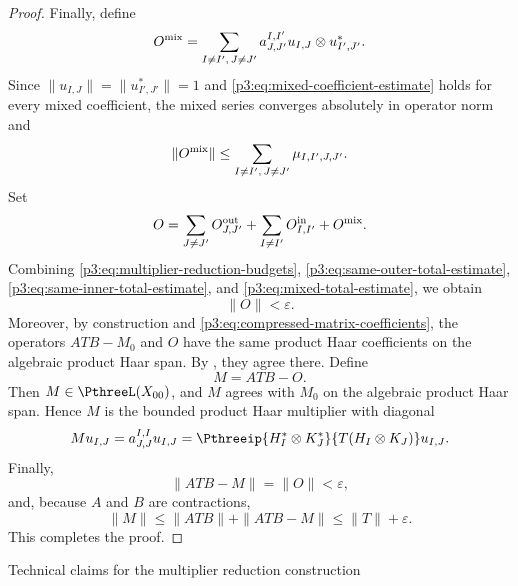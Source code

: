 \documentclass[11pt,reqno]{amsart}
\makeatletter
\theoremstyle{plain}
\theoremstyle{definition}
\newcounter{problempaper}
\newenvironment{problempaperbody}{%
  \setcounter{subsection}{0}%
  \setcounter{subsubsection}{0}%
  \setcounter{paragraph}{0}%
  \renewcommand{\thesubsection}{\arabic{subsection}}%
  \renewcommand{\thesubsubsection}{\thesubsection.\arabic{subsubsection}}%
  \renewcommand{\theparagraph}{\thesubsubsection.\arabic{paragraph}}%
  \let\problem@outersection\section
  \let\problem@outersubsection\subsection
  \let\problem@outersubsubsection\subsubsection
  \let\problem@outerparagraph\paragraph
  \let\section\problem@papersection
  \let\subsection\problem@papersubsection
  \let\subsubsection\problem@papersubsubsection
}{%
  \let\section\problem@outersection
  \let\subsection\problem@outersubsection
  \let\subsubsection\problem@outersubsubsection
  \let\paragraph\problem@outerparagraph
}
\newcommand{\problem@target}[2]{%
  \hypertarget{problem-\theproblempaper-#1-#2}{}%
}
\newcommand{\problem@paperheading}[3]{%
  \par\bigskip
  \problem@target{#1}{#2}%
  \noindent{\large\bfseries #2.\quad #3\par}%
  \nobreak\smallskip
}
\newcommand{\problem@papersubheading}[3]{%
  \par\medskip
  \problem@target{#1}{#2}%
  \noindent{\normalsize\bfseries #2.\quad #3\par}%
  \nobreak\smallskip
}
\newcommand{\problem@papersubsubheading}[3]{%
  \par\smallskip
  \problem@target{#1}{#2}%
  \noindent{\normalsize\itshape #2.\quad #3.\ }%
}
\def\problem@papersection{%
  \@ifstar{\problem@papersectionstar}{\problem@papersectionnostar}%
}
\def\problem@papersectionstar#1{%
  \par\bigskip\noindent{\large\bfseries #1\par}\nobreak\smallskip
}
\def\problem@papersectionnostar#1{%
  \refstepcounter{subsection}%
  \setcounter{subsubsection}{0}%
  \setcounter{paragraph}{0}%
  \problem@paperheading{section}{\thesubsection}{#1}%
  \problem@writecontentsline{section}{\thesubsection}{#1}%
}
\def\problem@papersubsection{%
  \@ifstar{\problem@papersubsectionstar}{\problem@papersubsectionnostar}%
}
\def\problem@papersubsectionstar#1{%
  \par\medskip\noindent{\normalsize\bfseries #1\par}\nobreak\smallskip
}
\def\problem@papersubsectionnostar#1{%
  \refstepcounter{subsubsection}%
  \setcounter{paragraph}{0}%
  \problem@papersubheading{subsection}{\thesubsubsection}{#1}%
  \problem@writecontentsline{subsection}{\thesubsubsection}{#1}%
}
\def\problem@papersubsubsection{%
  \@ifstar{\problem@papersubsubsectionstar}{\problem@papersubsubsectionnostar}%
}
\def\problem@papersubsubsectionstar#1{%
  \par\smallskip\noindent{\normalsize\itshape #1.\ }%
}
\def\problem@papersubsubsectionnostar#1{%
  \refstepcounter{paragraph}%
  \problem@papersubsubheading{subsubsection}{\theparagraph}{#1}%
  \problem@writecontentsline{subsubsection}{\theparagraph}{#1}%
}
\newcommand{\problem@writecontentsline}[3]{%
  \begingroup
  \protected@write\@auxout{}{%
    \string\problemcontentsentry{\theproblempaper}{#1}{#2}{#3}{\thepage}%
  }%
  \endgroup
}
\newcommand{\problemcontentsentry}[5]{%
  \@ifundefined{problemcontents@#1}{%
    \expandafter\gdef\csname problemcontents@#1\endcsname{}%
  }{}%
  \expandafter\g@addto@macro\csname problemcontents@#1\endcsname{%
    \problemcontentsline{#1}{#2}{#3}{#4}{#5}%
  }%
}
\newcommand{\problemcontentslink}[4]{%
  \hyperlink{problem-#1-#2-#3}{#4}%
}
\newcommand{\problemcontentsline}[5]{%
  \ifstrequal{#2}{section}{%
    \par\noindent
    \problemcontentslink{#1}{#2}{#3}{\makebox[2.5em][l]{#3}#4}%
    \nobreak\dotfill
    \problemcontentslink{#1}{#2}{#3}{#5}\par
  }{%
    \ifstrequal{#2}{subsection}{%
      \par\noindent\hspace*{1.5em}%
      \problemcontentslink{#1}{#2}{#3}{\makebox[3.5em][l]{#3}#4}%
      \nobreak\dotfill
      \problemcontentslink{#1}{#2}{#3}{#5}\par
    }{%
      \par\noindent\hspace*{3em}%
      \problemcontentslink{#1}{#2}{#3}{\makebox[4.5em][l]{#3}#4}%
      \nobreak\dotfill
      \problemcontentslink{#1}{#2}{#3}{#5}\par
    }%
  }%
}
\makeatother
\begin{document}
\begin{problempaperbody}
\begin{proof}
Finally, define
\begin{equation*}
        O^{\rm mix}=\sum_{I\ne I',\,J\ne J'}a_{J,J'}^{I,I'}u_{I,J}\otimes u_{I',J'}^*.
\end{equation*}
Since $\|u_{I,J}\|=\|u_{I',J'}^*\|=1$ and \eqref{p3:eq:mixed-coefficient-estimate} holds for every mixed coefficient, the mixed series converges absolutely in operator norm and
\begin{equation}
\label{p3:eq:mixed-total-estimate}
        \|O^{\rm mix}\|\leq \sum_{I\ne I',\,J\ne J'}\mu_{I,I',J,J'}.
\end{equation}
Set
\begin{equation*}
        O=\sum_{J\ne J'}O_{J,J'}^{\rm out}+\sum_{I\ne I'}O_{I,I'}^{\rm in}+O^{\rm mix}.
\end{equation*}
Combining \eqref{p3:eq:multiplier-reduction-budgets}, \eqref{p3:eq:same-outer-total-estimate}, \eqref{p3:eq:same-inner-total-estimate}, and \eqref{p3:eq:mixed-total-estimate}, we obtain
\begin{equation*}
        \|O\|<\varepsilon.
\end{equation*}
Moreover, by construction and \eqref{p3:eq:compressed-matrix-coefficients}, the operators $ATB-M_0$ and $O$ have the same product Haar coefficients on the algebraic product Haar span. By , they agree there. Define
\begin{equation*}
        M=ATB-O.
\end{equation*}
Then $M\in\PthreeL(X_{00})$, and $M$ agrees with $M_0$ on the algebraic product Haar span. Hence $M$ is the bounded product Haar multiplier with diagonal
\begin{equation*}
        Mu_{I,J}=a_{J,J}^{I,I}u_{I,J}=\Pthreeip{H_I^*\otimes K_J^*}{T(H_I\otimes K_J)}u_{I,J}.
\end{equation*}
Finally,
\begin{equation*}
        \|ATB-M\|=\|O\|<\varepsilon,
\end{equation*}
and, because $A$ and $B$ are contractions,
\begin{equation*}
        \|M\|\leq\|ATB\|+\|ATB-M\|\leq\|T\|+\varepsilon.
\end{equation*}
This completes the proof.
\end{proof}

\section{Technical claims for the multiplier reduction construction}
\label{p3:sec:technical-claims-multiplier-reduction}


\end{problempaperbody}
\end{document}
